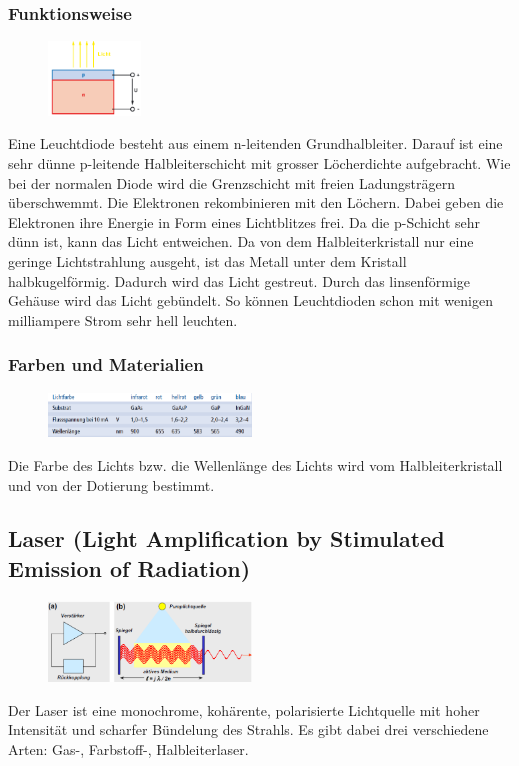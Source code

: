 \subsubsection{Funktionsweise}
\begin{figure}
    \centering
    \includegraphics[width=0.22\textwidth]{images/LED}
\end{figure}
Eine Leuchtdiode besteht aus einem n-leitenden Grundhalbleiter. Darauf ist eine sehr dünne p-leitende Halbleiterschicht mit grosser Löcherdichte aufgebracht. Wie bei der normalen Diode wird die Grenzschicht mit freien Ladungsträgern überschwemmt. Die Elektronen rekombinieren mit den Löchern. Dabei geben die Elektronen ihre Energie in Form eines Lichtblitzes frei. Da die p-Schicht sehr dünn ist, kann das Licht entweichen. Da von dem Halbleiterkristall nur eine geringe Lichtstrahlung ausgeht, ist das Metall unter dem Kristall halbkugelförmig. Dadurch wird das Licht gestreut. Durch das linsenförmige Gehäuse wird das Licht gebündelt. So können Leuchtdioden schon mit wenigen milliampere Strom sehr hell leuchten.

\subsubsection{Farben und Materialien}
\begin{figure}
    \vspace{-12pt}
    \centering
    \includegraphics[width=0.48\textwidth]{images/kennwert_LED}
\end{figure}
Die Farbe des Lichts bzw. die Wellenlänge des Lichts wird vom Halbleiterkristall und von der Dotierung bestimmt. \\

\subsection{Laser (Light Amplification by Stimulated Emission of Radiation)}
\begin{figure}
    \vspace{-12pt}
    \centering
    \includegraphics[width=0.48\textwidth]{images/laser}
\end{figure}
Der Laser ist eine monochrome, kohärente, polarisierte Lichtquelle mit hoher Intensität und scharfer Bündelung des Strahls. Es gibt dabei drei verschiedene Arten: Gas-, Farbstoff-, Halbleiterlaser.

